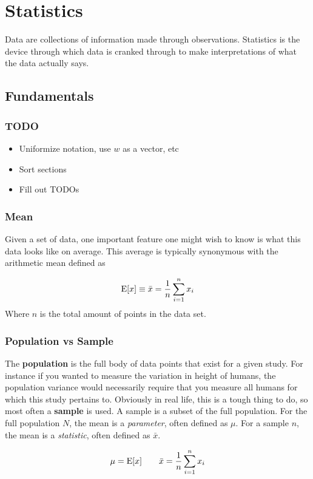 \chapter{Statistics}
Data are collections of information made through observations. Statistics is the device through which data is cranked through to make interpretations of what the data actually says.

\section{Fundamentals}
\subsection{TODO}
\begin{itemize}
	\item Uniformize notation, use $w$ as a vector, etc
	\item Sort sections
	\item Fill out TODOs
\end{itemize}

\subsection{Mean}
Given a set of data, one important feature one might wish to know is what this data looks like on average. This average is typically synonymous with the arithmetic mean defined as 

\begin{align}
\mathrm{E}[x] \equiv \bar{x} = \frac{1}{n}\sum_{i=1}^n x_i
\end{align}
Where $n$ is the total amount of points in the data set.
\subsection{Population vs Sample}
The \textbf{population} is the full body of data points that exist for a given study. For instance if you wanted to measure the variation in height of humans, 
the population variance would necessarily require that you measure all humans for which this study pertains to. Obviously in real life, this is a tough thing to do, 
so most often a \textbf{sample} is used. A sample is a subset of the full population. For the full population $N$, the mean is a \emph{parameter}, often defined as $\mu$.
For a sample $n$, the mean is a \emph{statistic}, often defined as $\bar{x}$.

\begin{align}
\mu = \mathrm{E}[x] \qquad \bar{x} = \frac{1}{n}\sum_{i=1}^n x_i
\end{align}

